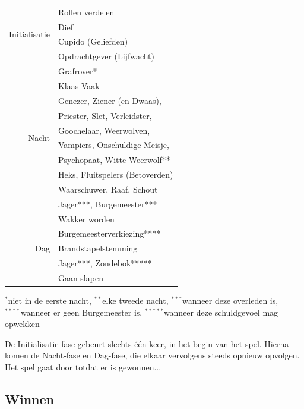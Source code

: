 \documentclass[12pt]{article}
\begin{document}
    \begin{center}
      \begin{tabular}{r|l}
	\multirow{4}{*}{Initialisatie} & Rollen verdelen \\ \cline{2-2}
	 & Dief \\ \cline{2-2}
	 & Cupido (Geliefden) \\ \cline{2-2}
	 & Opdrachtgever (Lijfwacht) \\
	\hline
	\hline
	\multirow{10}{*}{Nacht} & Grafrover* \\ \cline{2-2}
	 & Klaas Vaak \\ \cline{2-2}
	 & Genezer, Ziener (en Dwaas), \\
	 & Priester, Slet, Verleidster, \\
	 & Goochelaar, Weerwolven, \\
	 & Vampiers, Onschuldige Meisje, \\
	 & Psychopaat, Witte Weerwolf** \\ \cline{2-2}
	 & Heks, Fluitspelers (Betoverden)\\ \cline{2-2}
	 & Waarschuwer, Raaf, Schout \\ \cline{2-2}
	 & Jager***, Burgemeester*** \\
	\hline
	\multirow{5}{*}{Dag} & Wakker worden \\ \cline{2-2}
	 & Burgemeesterverkiezing**** \\ \cline{2-2}
	 & Brandstapelstemming \\ \cline{2-2}
	 & Jager***, Zondebok***** \\ \cline{2-2}
	 & Gaan slapen \\
      \end{tabular}
      
      {\scriptsize \noindent $^{\ast}$niet in de eerste nacht, 
      $^{\ast\ast}$elke tweede nacht, 
      $^{\ast\ast\ast}$wanneer deze overleden is, \\
      $^{\ast\ast\ast\ast}$wanneer er geen Burgemeester is,
      $^{\ast\ast\ast\ast\ast}$wanneer deze schuldgevoel mag opwekken}
      
    \end{center}
    
    De Initialisatie-fase gebeurt slechts \'e\'en keer, in het begin van het spel. Hierna komen de Nacht-fase en Dag-fase, die elkaar vervolgens steeds opnieuw opvolgen. Het spel gaat door totdat er is gewonnen...
    
  \subsection{Winnen} \label{subsec:winnen}
  
\end{document}
